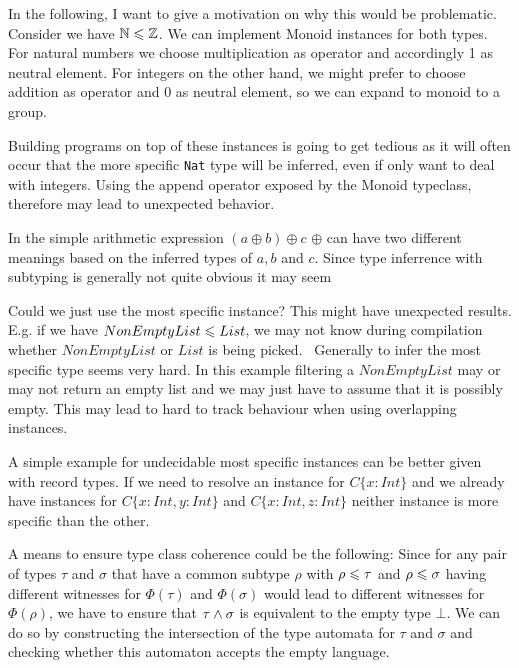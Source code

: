   In the following, I want to give a motivation on why this would be problematic.
  Consider we have $\mathbb{N} \leqslant \mathbb{Z}$.
  We can implement Monoid instances for both types. For natural numbers we choose multiplication as operator and accordingly 1 as neutral element.
  For integers on the other hand, we might prefer to choose addition as operator and 0 as neutral element, so we can expand to monoid to a group.

  Building programs on top of these instances is going to get tedious as it will often occur that the more specific \texttt{Nat} type will be inferred,
  even if only want to deal with integers.
  Using the append operator exposed by the Monoid typeclass, therefore may lead to unexpected behavior.

  In the simple arithmetic expression $(a \oplus b) \oplus c$ $\oplus$ can have two different meanings based on the inferred types of $a,b$ and $c$.
  Since type inferrence with subtyping is generally not quite obvious it may seem 

  Could we just use the most specific instance? This might have unexpected results.
  E.g. if we have $NonEmptyList \leqslant List$, we may not know during compilation whether $NonEmptyList$ or $List$ is being picked.
  ~Generally to infer the most specific type seems very hard. In this example filtering a $NonEmptyList$ may or may not return an empty list and we may just have to assume that it is possibly empty.
  This may lead to hard to track behaviour when using overlapping instances.

  A simple example for undecidable most specific instances can be better given with record types.
  If we need to resolve an instance for $C \{x : Int\}$ and we already have instances for $C \{x : Int, y : Int\}$ and $C \{x : Int, z : Int\}$ neither instance is more specific than the other.

  
  A means to ensure type class coherence could be the following:
  Since for any pair of types $\tau$ and $\sigma$ that have a common subtype $\rho$ with $\rho \leqslant \tau$ and $\rho \leqslant \sigma$ having different witnesses for $\Phi(\tau)$ and $\Phi(\sigma)$ would lead to different witnesses for $\Phi(\rho)$,
  we have to ensure that $\tau \wedge \sigma$ is equivalent to the empty type $\bot$.
  We can do so by constructing the intersection of the type automata for $\tau$ and $\sigma$ and checking whether this automaton accepts the empty language.

